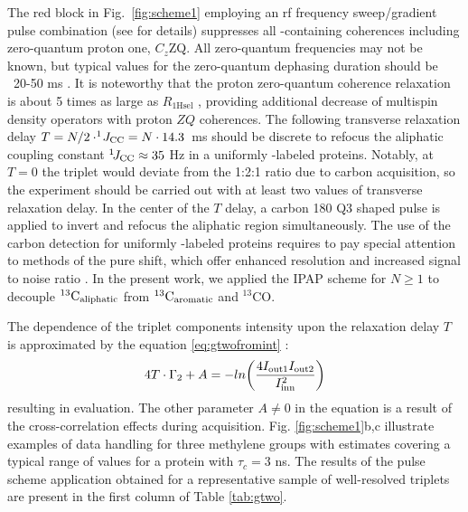 \documentclass[twocolumn]{svjour3}           %
\begin{document}
The red block in  Fig.~\ref{fig:scheme1} employing an rf frequency sweep\slash gradient pulse 
combination (see \cite{thrippleton_elimination_2003,harris_zero-quantum_2011,claridge_experimental_2009} for details) suppresses all \hlab-containing coherences including zero-quantum proton one, $C_z \text{ZQ}$. All zero-\-quan\-tum frequencies may not be known, but typical values for the zero-quantum dephasing duration should be ~20-50 ms \cite{claridge_experimental_2009}.
It is noteworthy that the proton zero-quantum 
coherence relaxation is about 5 times as large as $R_{\text{1Hsel}}$ 
\cite{zheng_measurement_2004}, providing additional decrease of multispin density operators with proton $ZQ$ coherences.
The following transverse relaxation delay  
$T = {N}/{2\cdot^1\!J_{\text{CC}}} = N\cdot 14.3$~ms should be discrete 
to refocus the aliphatic coupling constant $^1\!J_{\text{CC}} \approx 35$ Hz in a 
uniformly \nclab-labeled proteins. Notably, at $T = 0$ the \clab{} triplet 
would deviate from the 1:2:1 ratio due to carbon acquisition, so the 
experiment should be carried out with at least two values of transverse 
relaxation delay. In the center of the $T$ delay, a carbon 180\degree{} Q3 
shaped pulse is applied to invert and refocus the aliphatic region 
simultaneously. The use of the carbon detection for uniformly \nclab-labeled proteins requires 
to pay special attention to methods of the \clab{} pure shift, which offer 
enhanced resolution and increased signal to noise ratio 
\cite{zangger_pure_2015}. In the present work, we applied the {IPAP} scheme 
for $N \ge 1$ to decouple ${}^{13}\text{C}_\text{aliphatic}$ from 
${}^{13}\text{C}_\text{aromatic}$ and $^{13}\text{CO}$. 

The dependence of the triplet components intensity 
upon the relaxation delay $T$ is 
approximated by the equation  \eqref{eq:gtwofromint}
\cite{carlomagno_errors_2000,zheng_measurement_2004}: 
\begin{equation}
\label{eq:sch1:intensity}
  4 T \cdot \Gamma_2 + A = - ln\biggl(\frac{4 I_\textrm{out1} I_\textrm{out2}}{I_\textrm{inn}^2}\biggr)
\end{equation}
resulting in \gtwo{} evaluation. The other parameter $A \ne 0$ in the 
equation is a result of the cross-correlation effects during \clab{} 
acquisition. Fig. \ref{fig:scheme1}b,c illustrate examples of data 
handling for three  methylene groups with \gtwo{} estimates covering a 
typical range of values for a protein with $\tau_c = 3$ ns. The results 
of the pulse scheme application obtained for a representative sample of
well-resolved \clab{} triplets are present in the first column of Table 
\ref{tab:gtwo}. 
\end{document}
